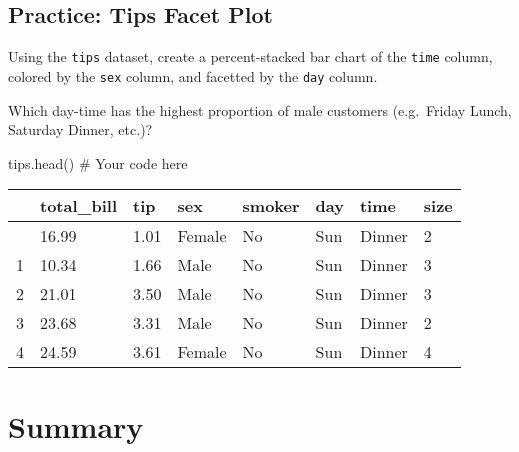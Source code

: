\documentclass[
  letterpaper,
  DIV=11,
  numbers=noendperiod]{scrreprt}
\newenvironment{Shaded}{\begin{snugshade}}{\end{snugshade}}
\newcommand{\CommentTok}[1]{\textcolor[rgb]{0.37,0.37,0.37}{#1}}
\newcommand{\NormalTok}[1]{\textcolor[rgb]{0.00,0.23,0.31}{#1}}
\begin{document}
\begin{tcolorbox}[enhanced jigsaw, colframe=quarto-callout-tip-color-frame, opacityback=0, titlerule=0mm, bottomrule=.15mm, breakable, leftrule=.75mm, colbacktitle=quarto-callout-tip-color!10!white, title=\textcolor{quarto-callout-tip-color}{\faLightbulb}\hspace{0.5em}{Practice}, rightrule=.15mm, coltitle=black, opacitybacktitle=0.6, colback=white, left=2mm, arc=.35mm, toptitle=1mm, bottomtitle=1mm, toprule=.15mm]

\subsection{Practice: Tips Facet Plot}\label{practice-tips-facet-plot}

Using the \texttt{tips} dataset, create a percent-stacked bar chart of
the \texttt{time} column, colored by the \texttt{sex} column, and
facetted by the \texttt{day} column.

Which day-time has the highest proportion of male customers (e.g.~Friday
Lunch, Saturday Dinner, etc.)?

\begin{Shaded}
\begin{Highlighting}[]
\NormalTok{tips.head()}
\CommentTok{\# Your code here}
\end{Highlighting}
\end{Shaded}

\begin{longtable}[]{@{}llllllll@{}}
\toprule\noalign{}
& total\_bill & tip & sex & smoker & day & time & size \\
\midrule\noalign{}
\endhead
\bottomrule\noalign{}
\endlastfoot
0 & 16.99 & 1.01 & Female & No & Sun & Dinner & 2 \\
1 & 10.34 & 1.66 & Male & No & Sun & Dinner & 3 \\
2 & 21.01 & 3.50 & Male & No & Sun & Dinner & 3 \\
3 & 23.68 & 3.31 & Male & No & Sun & Dinner & 2 \\
4 & 24.59 & 3.61 & Female & No & Sun & Dinner & 4 \\
\end{longtable}

\end{tcolorbox}

\section{Summary}\label{summary-1}
\end{document}
